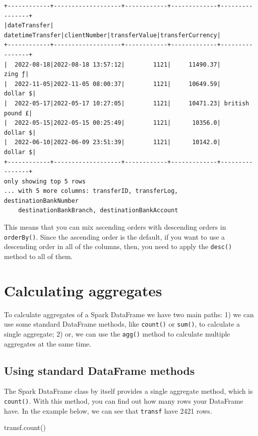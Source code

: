 \documentclass[
  11pt,
  letterpaper,
  DIV=11,
  numbers=noendperiod]{scrreprt}
\newenvironment{Shaded}{\begin{snugshade}}{\end{snugshade}}
\newcommand{\NormalTok}[1]{\textcolor[rgb]{0.00,0.23,0.31}{#1}}
\begin{document}
\begin{verbatim}
+------------+-------------------+------------+-------------+----------------+
|dateTransfer|   datetimeTransfer|clientNumber|transferValue|transferCurrency|
+------------+-------------------+------------+-------------+----------------+
|  2022-08-18|2022-08-18 13:57:12|        1121|     11490.37|          zing ƒ|
|  2022-11-05|2022-11-05 08:00:37|        1121|     10649.59|        dollar $|
|  2022-05-17|2022-05-17 10:27:05|        1121|     10471.23| british pound £|
|  2022-05-15|2022-05-15 00:25:49|        1121|      10356.0|        dollar $|
|  2022-06-10|2022-06-09 23:51:39|        1121|      10142.0|        dollar $|
+------------+-------------------+------------+-------------+----------------+
only showing top 5 rows
... with 5 more columns: transferID, transferLog, destinationBankNumber
    destinationBankBranch, destinationBankAccount
\end{verbatim}

This means that you can mix ascending orders with descending orders in
\texttt{orderBy()}. Since the ascending order is the default, if you
want to use a descending order in all of the columns, then, you need to
apply the \texttt{desc()} method to all of them.

\hypertarget{calculating-aggregates}{%
\section{Calculating aggregates}\label{calculating-aggregates}}

To calculate aggregates of a Spark DataFrame we have two main paths: 1)
we can use some standard DataFrame methods, like \texttt{count()} or
\texttt{sum()}, to calculate a single aggregate; 2) or, we can use the
\texttt{agg()} method to calculate multiple aggregates at the same time.

\hypertarget{using-standard-dataframe-methods}{%
\subsection{Using standard DataFrame
methods}\label{using-standard-dataframe-methods}}

The Spark DataFrame class by itself provides a single aggregate method,
which is \texttt{count()}. With this method, you can find out how many
rows your DataFrame have. In the example below, we can see that
\texttt{transf} have 2421 rows.

\begin{Shaded}
\begin{Highlighting}[]
\NormalTok{transf.count()}
\end{Highlighting}
\end{Shaded}
\end{document}

